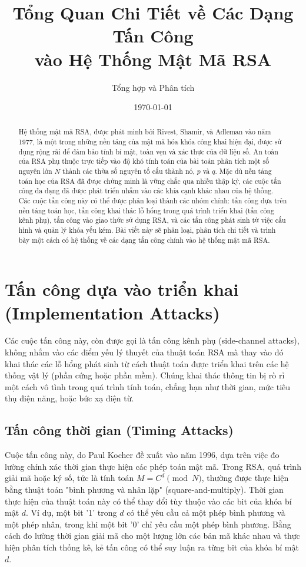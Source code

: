 \documentclass[12pt, a4paper]{article}
\title{\textbf{Tổng Quan Chi Tiết về Các Dạng Tấn Công \\ vào Hệ Thống Mật Mã RSA}}
\author{Tổng hợp và Phân tích}
\date{\today}
\begin{document}
\maketitle

\begin{abstract}
\noindent %
Hệ thống mật mã RSA, được phát minh bởi Rivest, Shamir, và Adleman vào năm 1977, là một trong những nền tảng của mật mã hóa khóa công khai hiện đại, được sử dụng rộng rãi để đảm bảo tính bí mật, toàn vẹn và xác thực của dữ liệu số. An toàn của RSA phụ thuộc trực tiếp vào độ khó tính toán của bài toán phân tích một số nguyên lớn $N$ thành các thừa số nguyên tố cấu thành nó, $p$ và $q$. Mặc dù nền tảng toán học của RSA đã được chứng minh là vững chắc qua nhiều thập kỷ, các cuộc tấn công đa dạng đã được phát triển nhắm vào các khía cạnh khác nhau của hệ thống. Các cuộc tấn công này có thể được phân loại thành các nhóm chính: tấn công dựa trên nền tảng toán học, tấn công khai thác lỗ hổng trong quá trình triển khai (tấn công kênh phụ), tấn công vào giao thức sử dụng RSA, và các tấn công phát sinh từ việc cấu hình và quản lý khóa yếu kém. Bài viết này sẽ phân loại, phân tích chi tiết và trình bày một cách có hệ thống về các dạng tấn công chính vào hệ thống mật mã RSA.
\end{abstract}



\section{Tấn công dựa vào triển khai (Implementation Attacks)}

Các cuộc tấn công này, còn được gọi là tấn công kênh phụ (side-channel attacks), không nhắm vào các điểm yếu lý thuyết của thuật toán RSA mà thay vào đó khai thác các lỗ hổng phát sinh từ cách thuật toán được triển khai trên các hệ thống vật lý (phần cứng hoặc phần mềm). Chúng khai thác thông tin bị rò rỉ một cách vô tình trong quá trình tính toán, chẳng hạn như thời gian, mức tiêu thụ điện năng, hoặc bức xạ điện từ.

\subsection{Tấn công thời gian (Timing Attacks)}
Cuộc tấn công này, do Paul Kocher đề xuất vào năm 1996, dựa trên việc đo lường chính xác thời gian thực hiện các phép toán mật mã. Trong RSA, quá trình giải mã hoặc ký số, tức là tính toán $M = C^d \pmod{N}$, thường được thực hiện bằng thuật toán "bình phương và nhân lặp" (square-and-multiply). Thời gian thực hiện của thuật toán này có thể thay đổi tùy thuộc vào các bit của khóa bí mật $d$. Ví dụ, một bit '1' trong $d$ có thể yêu cầu cả một phép bình phương và một phép nhân, trong khi một bit '0' chỉ yêu cầu một phép bình phương. Bằng cách đo lường thời gian giải mã cho một lượng lớn các bản mã khác nhau và thực hiện phân tích thống kê, kẻ tấn công có thể suy luận ra từng bit của khóa bí mật $d$.
\end{document}
